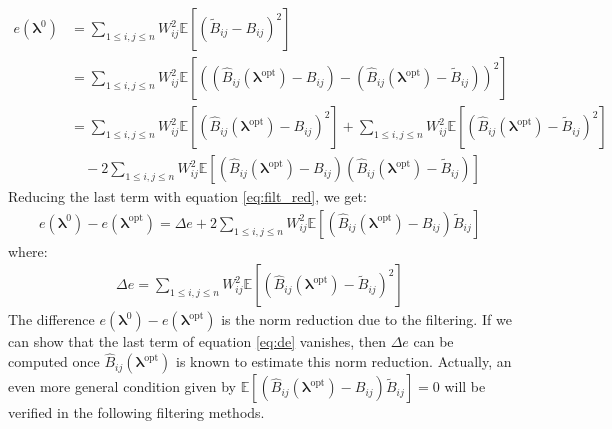 \documentclass[12pt]{scrartcl}
\begin{document}
\begin{align}
e\left(\boldsymbol{\lambda}^0\right) & = \sum_{1 \le i,j \le n} W_{ij}^2 \mathbb{E}\left[ \left(\widetilde{B}_{ij} - B_{ij} \right)^2 \right] \nonumber \\
& = \sum_{1 \le i,j \le n} W_{ij}^2 \mathbb{E}\left[ \left(\left(\widehat{B}_{ij}\left(\boldsymbol{\lambda}^\mathrm{opt}\right) - B_{ij}\right) - \left(\widehat{B}_{ij}\left(\boldsymbol{\lambda}^\mathrm{opt}\right) - \widetilde{B}_{ij}\right)\right)^2 \right] \nonumber \\
& = \sum_{1 \le i,j \le n} W_{ij}^2 \mathbb{E}\left[ \left(\widehat{B}_{ij}\left(\boldsymbol{\lambda}^\mathrm{opt}\right) - B_{ij}\right)^2\right] + \sum_{1 \le i,j \le n} W_{ij}^2 \mathbb{E}\left[ \left(\widehat{B}_{ij}\left(\boldsymbol{\lambda}^\mathrm{opt}\right) - \widetilde{B}_{ij}\right)^2\right] \nonumber \\
& \quad - 2 \sum_{1 \le i,j \le n} W_{ij}^2 \mathbb{E}\left[\left(\widehat{B}_{ij}\left(\boldsymbol{\lambda}^\mathrm{opt}\right) - B_{ij}\right) \left(\widehat{B}_{ij}\left(\boldsymbol{\lambda}^\mathrm{opt}\right) - \widetilde{B}_{ij}\right) \right]
\end{align}
Reducing the last term with equation \eqref{eq:filt_red}, we get:
\begin{align}
\label{eq:de}
e\left(\boldsymbol{\lambda}^0\right) - e\left(\boldsymbol{\lambda}^\mathrm{opt}\right) = \Delta e + 2 \sum_{1 \le i,j \le n} W_{ij}^2 \mathbb{E}\left[ \left(\widehat{B}_{ij}\left(\boldsymbol{\lambda}^\mathrm{opt}\right) - B_{ij}\right) \widetilde{B}_{ij} \right]
\end{align}
where:
\begin{align}
\Delta e = \sum_{1 \le i,j \le n} W_{ij}^2 \mathbb{E}\left[ \left(\widehat{B}_{ij}\left(\boldsymbol{\lambda}^\mathrm{opt}\right) - \widetilde{B}_{ij}\right)^2\right]
\end{align}
The difference $e\left(\boldsymbol{\lambda}^0\right) - e\left(\boldsymbol{\lambda}^\mathrm{opt}\right)$ is the norm reduction due to the filtering. If we can show that the last term of equation \eqref{eq:de} vanishes, then $\Delta e$ can be computed once $\widehat{B}_{ij}\left(\boldsymbol{\lambda}^\mathrm{opt}\right)$ is known to estimate this norm reduction. Actually, an even more general condition given by $\displaystyle \mathbb{E}\left[\left(\widehat{B}_{ij}\left(\boldsymbol{\lambda}^\mathrm{opt}\right) - B_{ij}\right) \widetilde{B}_{ij}  \right] = 0$ will be verified in the following filtering methods.\\
\end{document}
